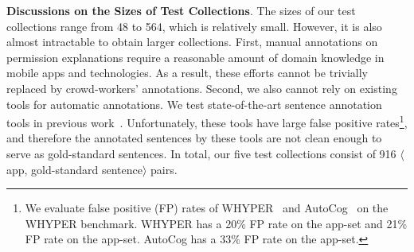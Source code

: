 \textbf{Discussions on the Sizes of Test Collections}. The sizes of our test collections range from 48 to 564, which is relatively small. However, it is also almost intractable to obtain larger collections. First, manual annotations on permission explanations require a reasonable amount of domain knowledge in mobile apps and technologies. As a result, these efforts cannot be trivially replaced by crowd-workers' annotations. Second, we also cannot rely on existing tools for automatic annotations. We test state-of-the-art sentence annotation tools in previous work~\cite{conf/uss/PanditaXYEX13,conf/ccs/QuRZCZC14}. Unfortunately, these tools have large false positive rates\footnote{We evaluate false positive (FP) rates of WHYPER~\cite{whyper} and AutoCog~\cite{conf/ccs/QuRZCZC14} on the WHYPER benchmark. 
	WHYPER has a 20\% FP rate on the   app-set and 21\% FP rate on the   app-set. 
	AutoCog has a 33\% FP rate on the  app-set.}, and therefore the annotated sentences by these tools are not clean enough to serve as gold-standard sentences. In total, our five test collections consist of 916  $\langle$app, gold-standard sentence$\rangle$ pairs.

